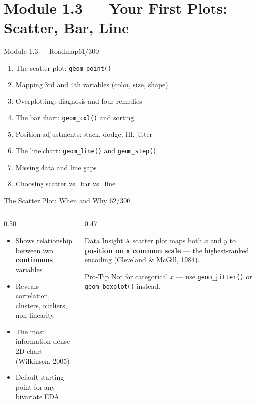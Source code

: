 \documentclass[10pt]{beamer}
\newcommand{\smark}[1]{\hfill{\scriptsize\color{codegray}#1}}
\begin{document}
\section{Module 1.3 --- Your First Plots: Scatter, Bar, Line}

\begin{frame}{Module 1.3 --- Roadmap}\smark{61/300}
\begin{enumerate}
    \item The scatter plot: \texttt{geom\_point()}
    \item Mapping 3rd and 4th variables (color, size, shape)
    \item Overplotting: diagnosis and four remedies
    \item The bar chart: \texttt{geom\_col()} and sorting
    \item Position adjustments: stack, dodge, fill, jitter
    \item The line chart: \texttt{geom\_line()} and \texttt{geom\_step()}
    \item Missing data and line gaps
    \item Choosing scatter vs.\ bar vs.\ line
\end{enumerate}
\end{frame}

\begin{frame}{The Scatter Plot: When and Why}
\smark{62/300}
\begin{columns}[T]
\begin{column}{0.50\textwidth}
\begin{itemize}
    \item Shows relationship between two \textbf{continuous} variables
    \item Reveals correlation, clusters, outliers, non-linearity
    \item The most information-dense 2D chart (Wilkinson, 2005)
    \item Default starting point for any bivariate EDA
\end{itemize}
\end{column}
\begin{column}{0.47\textwidth}
\begin{exampleblock}{Data Insight}
    \scriptsize A scatter plot maps both $x$ and $y$ to \textbf{position on a common scale} --- the highest-ranked encoding (Cleveland \& McGill, 1984).
\end{exampleblock}
\vspace{0.2cm}
\begin{alertblock}{Pro-Tip}
    \scriptsize Not for categorical $x$ --- use \texttt{geom\_jitter()} or \texttt{geom\_boxplot()} instead.
\end{alertblock}
\end{column}
\end{columns}
\end{frame}
\end{document}
